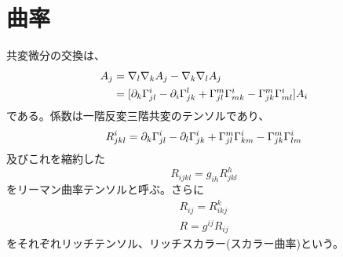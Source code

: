 \section{曲率}
    共変微分の交換は、
    \begin{align*}
        [\na_l,\na_k]A_j &= \na_l\na_kA_j-\na_k\na_lA_j\\
        &= [\pa_k\Ga^i_{jl}-\pa_i\Ga^l_{jk}
        +\Ga^m_{jl}\Ga^i_{mk}-\Ga^m_{jk}\Ga^i_{ml}]A_i
    \end{align*}
    である。係数は一階反変三階共変のテンソルであり、
    \[R^i_{jkl}
        =\partial_k\Gamma^i_{jl}-\partial_l\Gamma^i_{jk}
        +\Gamma^m_{jl}\Gamma^i_{km}-\Gamma^m_{jk}\Gamma^i_{lm}\]
    及びこれを縮約した
        \[R_{ijkl} = g_{ih}R^h_{jkl}\]
    をリーマン曲率テンソルと呼ぶ。さらに
    \begin{gather*}
        R_{ij} = R^k_{ikj}\\
        R = g^{ij}R_{ij}
    \end{gather*}
    をそれぞれリッチテンソル、リッチスカラー(スカラー曲率)という。


